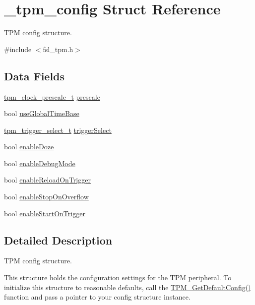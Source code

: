 \hypertarget{struct__tpm__config}{}\section{\+\_\+tpm\+\_\+config Struct Reference}
\label{struct__tpm__config}


T\+PM config structure.  




{\ttfamily \#include $<$fsl\+\_\+tpm.\+h$>$}

\subsection*{Data Fields}
\begin{DoxyCompactItemize}
\item 
\mbox{\hyperlink{group__tpm_gad9e7d333c0c3ad41d6bc740d95004dac}{tpm\+\_\+clock\+\_\+prescale\+\_\+t}} \mbox{\hyperlink{struct__tpm__config_a07aeffac07e1ce1b00be27db7a55f8b4}{prescale}}
\item 
bool \mbox{\hyperlink{struct__tpm__config_af416ab48aec0988cb89bfd89ec771062}{use\+Global\+Time\+Base}}
\item 
\mbox{\hyperlink{group__tpm_ga7413575956cb565fba0cc99c39c73bc7}{tpm\+\_\+trigger\+\_\+select\+\_\+t}} \mbox{\hyperlink{struct__tpm__config_a6d30d8f871d548b2a9b1533373c5234d}{trigger\+Select}}
\item 
bool \mbox{\hyperlink{struct__tpm__config_adc33c54dc06ce1822fe921591e5b4d8a}{enable\+Doze}}
\item 
bool \mbox{\hyperlink{struct__tpm__config_a98bdc9160cf6b06bd551081e3eab65ee}{enable\+Debug\+Mode}}
\item 
bool \mbox{\hyperlink{struct__tpm__config_a7898ff248982be3ba0c9196891db131e}{enable\+Reload\+On\+Trigger}}
\item 
bool \mbox{\hyperlink{struct__tpm__config_a8dc09bef3942120a287e07d6f55a291e}{enable\+Stop\+On\+Overflow}}
\item 
bool \mbox{\hyperlink{struct__tpm__config_a6083d820c0646893e6e636a99e5a062f}{enable\+Start\+On\+Trigger}}
\end{DoxyCompactItemize}


\subsection{Detailed Description}
T\+PM config structure. 

This structure holds the configuration settings for the T\+PM peripheral. To initialize this structure to reasonable defaults, call the \mbox{\hyperlink{group__tpm_ga53fcb634d4c70d9bcb14c972944d949f}{T\+P\+M\+\_\+\+Get\+Default\+Config()}} function and pass a pointer to your config structure instance.


